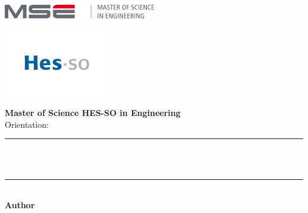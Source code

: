 
\begin{titlepage}
    \begin{center}
        \sffamily%
        \begin{minipage}{0.5\textwidth}
            \raggedright%
            \includegraphics[height=0.6cm]{img/mse_logo}  %
        \end{minipage}%
        \begin{minipage}{0.5\textwidth}
            \raggedleft%
            \includegraphics[height=3cm]{img/HES_SO_Logo_RGB}  %
        \end{minipage}

        \vspace{1cm}

        {\large\textbf{Master of Science HES-SO in Engineering}}\\
        {\large Orientation: \Orientation}\\[2cm]

        \rule{\textwidth}{0.4mm} \\[0.5cm]
        {\Huge\textbf{\ThesisTitle}}\\[0.3cm]
        \rule{\textwidth}{0.4mm}\\[1cm]

        {\LARGE\textbf{Author}}\\[0.1cm]
        {\Large\Author}\\[0.8cm]
        {\Large\textit{\ThesisSubject}}\\[2cm]


\end{center}
\end{titlepage}
